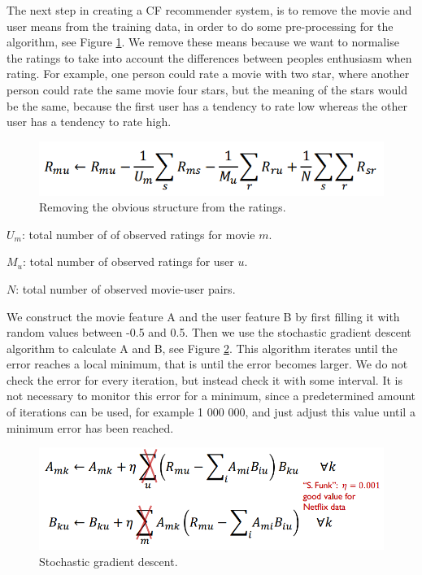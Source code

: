 	The next step in creating a CF recommender system, is to remove the movie and user means from the training data, in order to do some pre-processing for the algorithm, see Figure \ref{fig:obv}. We remove these means because we want to normalise the ratings to take into account the differences between peoples enthusiasm when rating. For example, one person could rate a movie with two star, where another person could rate the same movie four stars, but the meaning of the stars would be the same, because the first user has a tendency to rate low whereas the other user has a tendency to rate high.
	
	\begin{figure}[h]
		\centering
		\includegraphics[scale=0.5]{obviousstructure}
		\caption{Removing the obvious structure from the ratings.}\label{fig:obv}
	\end{figure}
	
	\begin{description}
		\item $U_m$: total number of of observed ratings for movie $m$.
		\item $M_u$: total number of observed ratings for user $u$.
		\item $N$: total number of observed movie-user pairs.
	\end{description}
	
	We construct the movie feature A and the user feature B	by first filling it with random values between -0.5 and 0.5. Then we use the stochastic gradient descent algorithm to calculate A and B, see Figure \ref{fig:stocalg}. This algorithm iterates until the error reaches a local minimum, that is until the error becomes larger. We do not check the error for every iteration, but instead check it with some interval. It is not necessary to monitor this error for a minimum, since a predetermined amount of iterations can be used, for example 1 000 000, and just adjust this value until a minimum error has been reached.
	
	\begin{figure}[h]
			\centering
			\includegraphics[scale=0.5]{sfunk}
			\caption{Stochastic gradient descent.}\label{fig:stocalg}
	\end{figure}
	
